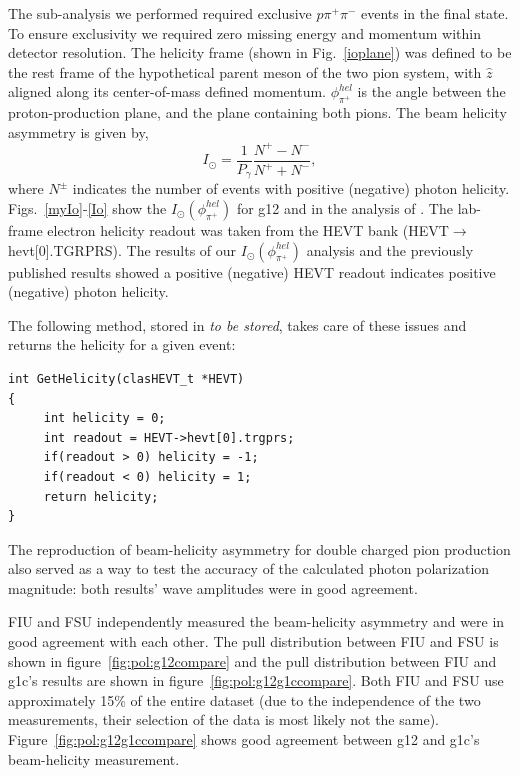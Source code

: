 The sub-analysis we performed required exclusive $p \pi^+ \pi^-$ events in the final state. To ensure exclusivity we required zero missing energy and momentum within detector resolution. The helicity frame (shown in Fig.~\ref{ioplane}) was defined to be the rest frame of the hypothetical parent meson of the two pion system, with  $\hat{z}$ aligned along its center-of-mass defined momentum. $\phi^{hel}_{\pi^+}$ is the angle between the proton-production plane, and the plane containing both pions. The beam helicity asymmetry is given by,
\begin{equation}
I_\odot = \frac{1}{P_{\gamma}} \frac{N^+ - N^-}{N^+ + N^-},
\end{equation}
where $N^\pm$ indicates the number of events with positive (negative) photon helicity.  Figs.~\ref{myIo}-\ref{Io} show the $I_{\odot}(\phi^{hel}_{\pi^+})$ for g12 and in the analysis of \cite{Io}.
The lab-frame electron helicity readout was taken from the HEVT bank (HEVT$\to$hevt[0].TGRPRS). The results of our $I_{\odot}(\phi^{hel}_{\pi^+})$ analysis and the previously published results showed a positive (negative) HEVT readout indicates positive (negative) photon helicity. \begin{v2}The following method, stored in \textit{to be stored}, takes care of these issues and returns the helicity for a given event:
\begin{verbatim}
int GetHelicity(clasHEVT_t *HEVT)
{
     int helicity = 0;
     int readout = HEVT->hevt[0].trgprs;
     if(readout > 0) helicity = -1;
     if(readout < 0) helicity = 1;
     return helicity;
}
\end{verbatim}
\end{v2}
The reproduction of beam-helicity asymmetry for double charged pion production also served as a way to test the accuracy of the calculated photon polarization magnitude: both results' wave amplitudes were in good agreement. \begin{v2}
FIU and FSU independently measured the beam-helicity asymmetry and were in good agreement with each other. The pull distribution between FIU and FSU is shown in figure~\ref{fig:pol:g12compare} and the pull distribution between FIU and g1c's results are shown in figure~\ref{fig:pol:g12g1ccompare}. Both FIU and FSU use approximately 15\% of the entire dataset (due to the independence of the two measurements, their selection of the data is most likely not the same). Figure~\ref{fig:pol:g12g1ccompare} shows good agreement between g12 and g1c's beam-helicity measurement.
\end{v2}

